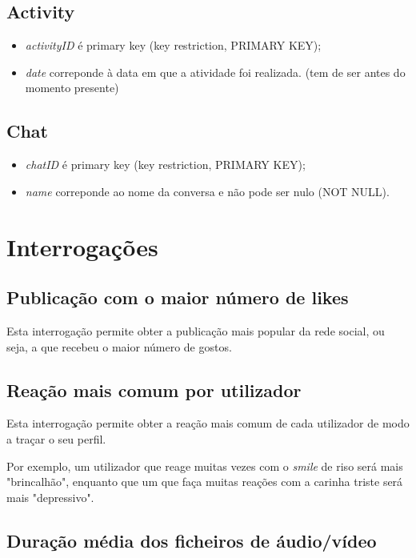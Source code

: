 \documentclass[12pt]{report}
\begin{document}
\section{Activity}

\begin{itemize}
    \item \textit{activityID} é primary key (key restriction, PRIMARY KEY);
    \item \textit{date} correponde à data em que a atividade foi realizada. (tem de ser antes do momento presente)
\end{itemize}

\section{Chat}

\begin{itemize}
    \item \textit{chatID} é primary key (key restriction, PRIMARY KEY);
    \item \textit{name} correponde ao nome da conversa e não pode ser nulo (NOT NULL).
\end{itemize}

\chapter{Interrogações}

\section{Publicação com o maior número de likes}

Esta interrogação permite obter a publicação mais popular da rede social, ou seja, a que recebeu o maior número de gostos. 

\section{Reação mais comum por utilizador}

Esta interrogação permite obter a reação mais comum de cada utilizador de modo a traçar o seu perfil. \par
Por exemplo, um utilizador que reage muitas vezes com o \textit{smile} de riso será mais "brincalhão", enquanto que um que faça muitas reações com a carinha triste será mais "depressivo".

\section{Duração média dos ficheiros de áudio/vídeo}
\end{document}
